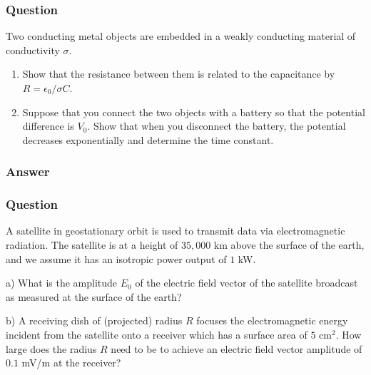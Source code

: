\subsubsection{Question}
Two conducting metal objects are embedded in a weakly conducting material of conductivity $\sigma$.
\begin{enumerate}
	\item Show that the resistance between them is related to the capacitance by $R = \epsilon_0 /\sigma C$.
	\item Suppose that you connect the two objects with a battery so that the potential difference is $V_0$. Show that when you disconnect the battery, the potential decreases exponentially and determine the time constant.
\end{enumerate}
\subsubsection{Answer}



\subsubsection{Question}
A satellite in geostationary orbit is used to transmit data via electromagnetic radiation. The satellite is at a height of $35,000$ km above the surface of the earth, and we assume it has an isotropic power output of $1$ kW.

a) What is the amplitude $E_0$ of the electric field vector of the satellite broadcast as measured at the surface of the earth?

b) A receiving dish of (projected) radius $R$ focuses the electromagnetic energy incident from the satellite onto a receiver which has a surface area of $5$ cm$^2$. How large does the radius $R$ need to be to achieve an electric field vector amplitude of $0.1$ mV/m at the receiver?
